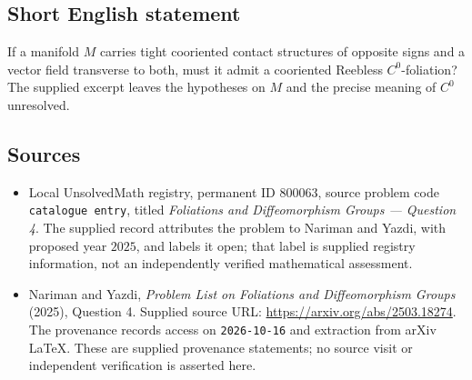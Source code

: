 \documentclass[11pt]{article}
\begin{document}
\subsection{Short English statement}
If a manifold \(M\) carries tight cooriented contact structures of opposite signs and a vector field transverse to both, must it admit a cooriented Reebless \(C^0\)-foliation? The supplied excerpt leaves the hypotheses on \(M\) and the precise meaning of \(C^0\) unresolved.
\subsection{Sources}
\begin{itemize}
\item Local UnsolvedMath registry, permanent ID \(800063\), source problem code \texttt{catalogue entry}, titled \emph{Foliations and Diffeomorphism Groups --- Question 4}. The supplied record attributes the problem to Nariman and Yazdi, with proposed year \(2025\), and labels it open; that label is supplied registry information, not an independently verified mathematical assessment.
\item Nariman and Yazdi, \emph{Problem List on Foliations and Diffeomorphism Groups} (2025), Question 4. Supplied source URL: \url{https://arxiv.org/abs/2503.18274}. The provenance records access on \texttt{2026-10-16} and extraction from arXiv LaTeX. These are supplied provenance statements; no source visit or independent verification is asserted here.
\end{itemize}
\end{document}
